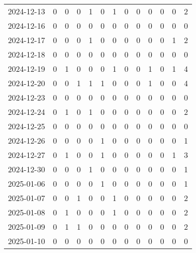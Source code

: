 \documentclass[dvipdfmx,oneside]{article}
\begin{document}
\begin{longtable}{lcccccccccccc}
        2024-12-13 &     0 &     0 &     0 &     1 &     0 &     1 &     0 &     0 &     0 &     0 &     0 &      2 \\
        2024-12-16 &     0 &     0 &     0 &     0 &     0 &     0 &     0 &     0 &     0 &     0 &     0 &      0 \\
        2024-12-17 &     0 &     0 &     0 &     1 &     0 &     0 &     0 &     0 &     0 &     0 &     1 &      2 \\
        2024-12-18 &     0 &     0 &     0 &     0 &     0 &     0 &     0 &     0 &     0 &     0 &     0 &      0 \\
        2024-12-19 &     0 &     1 &     0 &     0 &     0 &     1 &     0 &     0 &     1 &     0 &     1 &      4 \\
        2024-12-20 &     0 &     0 &     1 &     1 &     1 &     0 &     0 &     0 &     1 &     0 &     0 &      4 \\
        2024-12-23 &     0 &     0 &     0 &     0 &     0 &     0 &     0 &     0 &     0 &     0 &     0 &      0 \\
        2024-12-24 &     0 &     1 &     0 &     1 &     0 &     0 &     0 &     0 &     0 &     0 &     0 &      2 \\
        2024-12-25 &     0 &     0 &     0 &     0 &     0 &     0 &     0 &     0 &     0 &     0 &     0 &      0 \\
        2024-12-26 &     0 &     0 &     0 &     0 &     1 &     0 &     0 &     0 &     0 &     0 &     0 &      1 \\
        2024-12-27 &     0 &     1 &     0 &     0 &     1 &     0 &     0 &     0 &     0 &     0 &     1 &      3 \\
        2024-12-30 &     0 &     0 &     0 &     1 &     0 &     0 &     0 &     0 &     0 &     0 &     0 &      1 \\
        2025-01-06 &     0 &     0 &     0 &     0 &     1 &     0 &     0 &     0 &     0 &     0 &     0 &      1 \\
        2025-01-07 &     0 &     0 &     1 &     0 &     0 &     1 &     0 &     0 &     0 &     0 &     0 &      2 \\
        2025-01-08 &     0 &     1 &     0 &     0 &     0 &     1 &     0 &     0 &     0 &     0 &     0 &      2 \\
        2025-01-09 &     0 &     1 &     1 &     0 &     0 &     0 &     0 &     0 &     0 &     0 &     0 &      2 \\
        2025-01-10 &     0 &     0 &     0 &     0 &     0 &     0 &     0 &     0 &     0 &     0 &     0 &      0 \\

\end{longtable}
\end{document}
